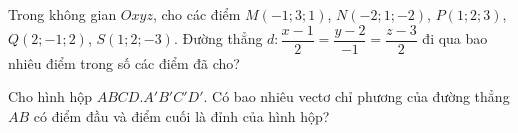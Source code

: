 \begin{bt}%
	Trong không gian $Oxyz$, cho các điểm $M(-1;3;1)$, $N(-2;1;-2)$, $P(1;2;3)$, $Q(2;-1;2)$, $S(1;2;-3)$. Đường thẳng $d \colon \dfrac{x-1}{2}=\dfrac{y-2}{-1}=\dfrac{z-3}{2}$ đi qua bao nhiêu điểm trong số các điểm đã  cho?
\end{bt}

\begin{bt}%
	Cho hình hộp $ABCD.A'B'C'D'$. Có bao nhiêu vectơ chỉ phương của đường thẳng $A B$ có  điểm đầu và điểm cuối là đỉnh của hình hộp?
\end{bt}



